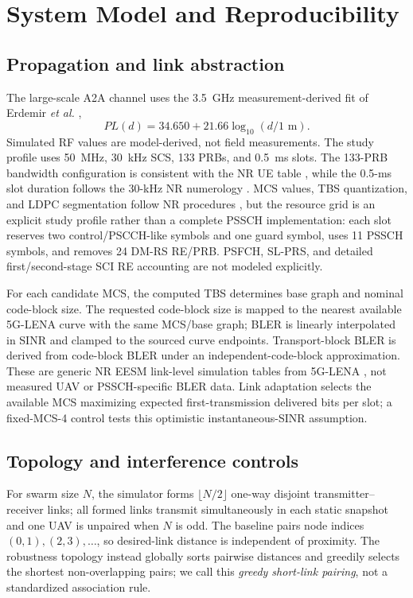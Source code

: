 \section{System Model and Reproducibility}
\subsection{Propagation and link abstraction}
The large-scale A2A channel uses the 3.5~GHz measurement-derived fit of Erdemir \emph{et al.} \cite{erdemir2023a2a},
\begin{equation}
 PL(d)=34.650+21.66\log_{10}(d/1\text{ m}).
\end{equation}
Simulated RF values are model-derived, not field measurements. The study profile uses 50~MHz, 30~kHz SCS, 133 PRBs, and 0.5~ms slots. The 133-PRB bandwidth configuration is consistent with the NR UE table \cite{3gpp38101}, while the 0.5-ms slot duration follows the 30-kHz NR numerology \cite{3gpp38211}. MCS values, TBS quantization, and LDPC segmentation follow NR procedures \cite{3gpp38212,3gpp38214}, but the resource grid is an explicit study profile rather than a complete PSSCH implementation: each slot reserves two control/PSCCH-like symbols and one guard symbol, uses 11 PSSCH symbols, and removes 24 DM-RS RE/PRB. PSFCH, SL-PRS, and detailed first/second-stage SCI RE accounting are not modeled explicitly.

For each candidate MCS, the computed TBS determines base graph and nominal code-block size. The requested code-block size is mapped to the nearest available 5G-LENA curve with the same MCS/base graph; BLER is linearly interpolated in SINR and clamped to the sourced curve endpoints. Transport-block BLER is derived from code-block BLER under an independent-code-block approximation. These are generic NR EESM link-level simulation tables from 5G-LENA \cite{patriciello2019e2e,ferreira2026lena}, not measured UAV or PSSCH-specific BLER data. Link adaptation selects the available MCS maximizing expected first-transmission delivered bits per slot; a fixed-MCS-4 control tests this optimistic instantaneous-SINR assumption.

\subsection{Topology and interference controls}
For swarm size $N$, the simulator forms $\lfloor N/2\rfloor$ one-way disjoint transmitter--receiver links; all formed links transmit simultaneously in each static snapshot and one UAV is unpaired when $N$ is odd. The baseline pairs node indices $(0,1),(2,3),\ldots$, so desired-link distance is independent of proximity. The robustness topology instead globally sorts pairwise distances and greedily selects the shortest non-overlapping pairs; we call this \emph{greedy short-link pairing}, not a standardized association rule.

